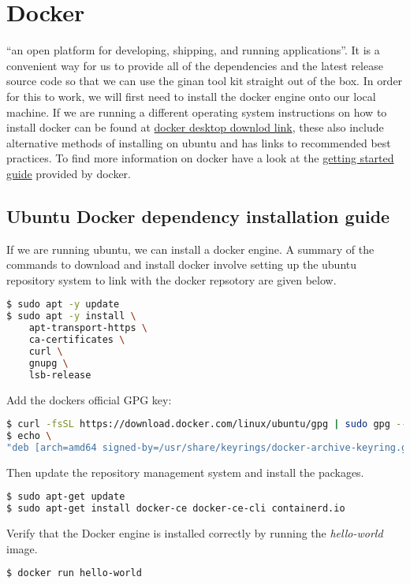 \chapter{Docker}
\label{ch:docker}
 ``an open platform for developing, shipping, and running applications''. It is a convenient way for us to provide all of the dependencies and the latest release source code so that we can use the ginan tool kit straight out of the box.
%
In order for this to work, we will first need to install the docker engine onto our local machine. If we are running a different operating system instructions on how to install docker can be found at \href{https://docs.docker.com/get-docker/}{docker desktop downlod link}, these also include alternative methods of installing on ubuntu and has links to recommended best practices.
%
To find more information on docker have a look at the \href{https://docs.docker.com/get-started/}{getting started guide} provided by docker.
%
\section{Ubuntu Docker dependency installation guide}
If we are running ubuntu, we can install a docker engine. A summary of the commands to download and install docker involve setting up the ubuntu repository system to link with the docker repsotory are given below.

\begin{lstlisting}[language=bash]
$ sudo apt -y update
$ sudo apt -y install \
    apt-transport-https \
    ca-certificates \
    curl \
    gnupg \
    lsb-release
\end{lstlisting}

Add the dockers official GPG key:
\begin{lstlisting}[language=bash]
$ curl -fsSL https://download.docker.com/linux/ubuntu/gpg | sudo gpg --dearmor -o /usr/share/keyrings/docker-archive-keyring.gpg
$ echo \
"deb [arch=amd64 signed-by=/usr/share/keyrings/docker-archive-keyring.gpg] https://download.docker.com/linux/ubuntu $(lsb_release -cs) stable" | sudo tee /etc/apt/sources.list.d/docker.list > /dev/null
\end{lstlisting}
%
Then update the repository management system and install the packages.
%
\begin{lstlisting}[language=bash]
$ sudo apt-get update
$ sudo apt-get install docker-ce docker-ce-cli containerd.io
\end{lstlisting}

Verify that the Docker engine is installed correctly by running the \emph{hello-world} image.
\begin{lstlisting}[language=bash]
$ docker run hello-world
\end{lstlisting}

